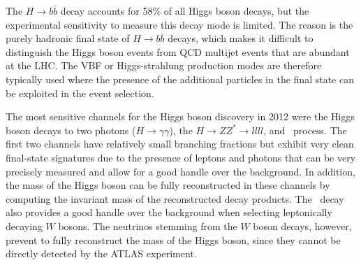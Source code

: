 The $H\rightarrow b\bar{b}$ decay accounts for 58\% of all Higgs boson decays, but the experimental sensitivity to measure this decay mode is limited. The reason is the purely hadronic final state of $H\rightarrow b\bar{b}$ decays, which makes it difficult to distinguish the Higgs boson events from QCD multijet events that are abundant at the LHC.
The VBF or Higgs-strahlung production modes are therefore typically used where the presence of the additional particles in the final state can be exploited in the event selection.

The most sensitive channels for the Higgs boson discovery in 2012 were the Higgs boson decays to two photons ($H \to \gamma\gamma$), the $H \to ZZ^* \to llll$, and \HWW\ process.
The first two channels have relatively small branching fractions but exhibit very clean final-state signatures due to the presence of leptons and photons that can be very precisely measured and allow for a good handle over the background.
In addition, the mass of the Higgs boson can be fully reconstructed in these channels by computing the invariant mass of the reconstructed decay products.
The \HWW\ decay also provides a good handle over the background when selecting leptonically decaying $W$ bosons.
The neutrinos stemming from the $W$ boson decays, however, prevent to fully reconstruct the mass of the Higgs boson, since they cannot be directly detected by the ATLAS experiment.



